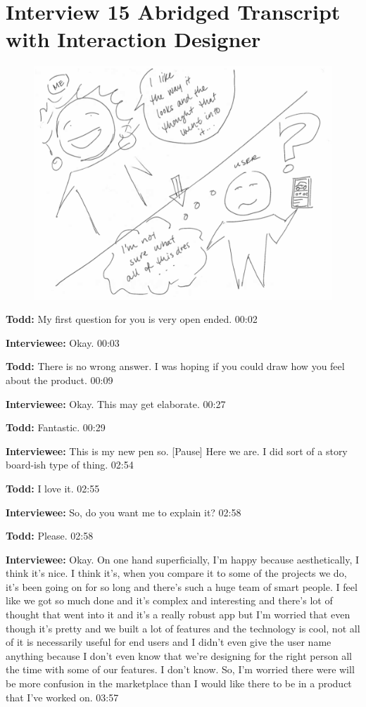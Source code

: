 \section{Interview 15 Abridged Transcript with Interaction Designer }

\begin{figure}[h]
\centering
\includegraphics[width=6.5in]{interviews/drawings/2016_01_08.png}
\caption{}
\label{2016_01_08}
\end{figure}

\textbf{Todd:} My first question for you is very open ended.  00:02

\textbf{Interviewee:} Okay.  00:03

\textbf{Todd:} There is no wrong answer.  I was hoping if you could draw how you feel about the product.  00:09

\textbf{Interviewee:} Okay.  This may get elaborate.  00:27

\textbf{Todd:} Fantastic.  00:29

\textbf{Interviewee:} This is my new pen so.  [Pause] Here we are.  I did sort of a story board-ish type of thing.  02:54

\textbf{Todd:} I love it.  02:55

\textbf{Interviewee:} So, do you want me to explain it?  02:58

\textbf{Todd:} Please.  02:58

\textbf{Interviewee:} Okay.  On one hand superficially, I'm happy because aesthetically, I think it's nice.  I think it's, when you compare it to some of the projects we do, it's been going on for so long and there's such a huge team of smart people.  I feel like we got so much done and it's complex and interesting and there's lot of thought that went into it and it's a really robust app but I'm worried that even though it's pretty and we built a lot of features and the technology is cool, not all of it is necessarily useful for end users and I didn't even give the user name anything because I don't even know that we're designing for the right person all the time with some of our features.  I don't know.  So, I'm worried there were will be more confusion in the marketplace than I would like there to be in a product that I've worked on.  03:57

